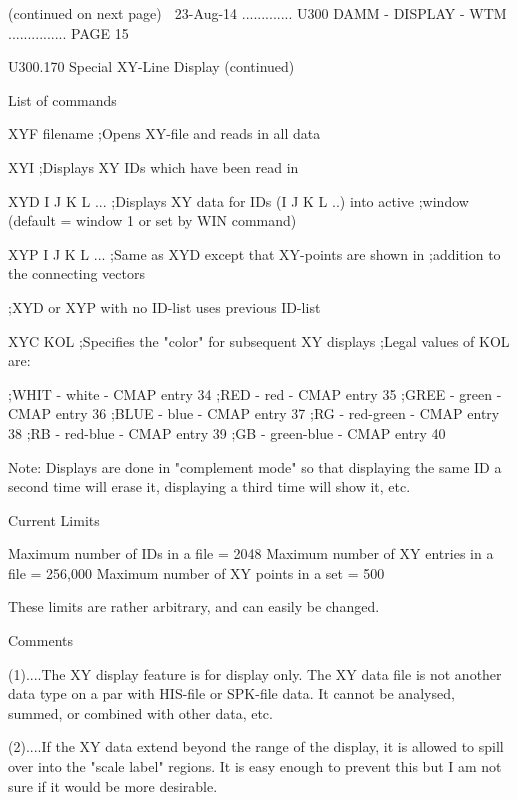  
 
                            (continued on next page)
    
   23-Aug-14 ............. U300  DAMM - DISPLAY - WTM ............... PAGE  15
 
 
   U300.170  Special XY-Line Display (continued)
 
   List of commands
 
   XYF  filename     ;Opens XY-file and reads in all data
 
   XYI               ;Displays XY IDs which have been read in
 
   XYD  I J K L ...  ;Displays XY data for IDs (I J K L ..) into active
                     ;window (default = window 1 or set by WIN command)
 
   XYP  I J K L ...  ;Same as XYD except that XY-points are shown in
                     ;addition to the connecting vectors
 
                     ;XYD or XYP with no ID-list uses previous ID-list
 
   XYC  KOL          ;Specifies the "color" for subsequent XY displays
                     ;Legal values of KOL are:
 
                     ;WHIT - white      - CMAP entry 34
                     ;RED  - red        - CMAP entry 35
                     ;GREE - green      - CMAP entry 36
                     ;BLUE - blue       - CMAP entry 37
                     ;RG   - red-green  - CMAP entry 38
                     ;RB   - red-blue   - CMAP entry 39
                     ;GB   - green-blue - CMAP entry 40
 
   Note:  Displays  are  done in "complement mode" so that displaying the same
   ID a second time will erase it, displaying a third time will show it, etc.
 
   Current Limits
 
   Maximum number of IDs        in a file = 2048
   Maximum number of XY entries in a file = 256,000
   Maximum number of XY points  in a set  = 500
 
   These limits are rather arbitrary, and can easily be changed.
 
   Comments
 
   (1)....The XY display feature is for display only. The XY data file is  not
          another  data  type  on  a  par  with  HIS-file or SPK-file data. It
          cannot be analysed, summed, or combined with other data, etc.
 
   (2)....If the XY data extend  beyond  the  range  of  the  display,  it  is
          allowed  to  spill  over  into the "scale label" regions. It is easy
          enough to prevent this but I  am  not  sure  if  it  would  be  more
          desirable.
 
